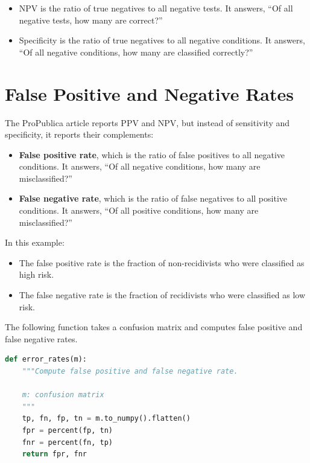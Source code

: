 \begin{itemize}
\item
  NPV is the ratio of true negatives to all negative tests. It answers,
  ``Of all negative tests, how many are correct?''
\item
  Specificity is the ratio of true negatives to all negative conditions.
  It answers, ``Of all negative conditions, how many are classified
  correctly?''
\end{itemize}

\hypertarget{false-positive-and-negative-rates}{%
\section{False Positive and Negative
Rates}\label{false-positive-and-negative-rates}}

The ProPublica article reports PPV and NPV, but instead of sensitivity
and specificity, it reports their complements:

\begin{itemize}
\item
  \textbf{False positive rate}, which is the ratio of false positives to
  all negative conditions. It answers, ``Of all negative conditions, how
  many are misclassified?''
\item
  \textbf{False negative rate}, which is the ratio of false negatives to
  all positive conditions. It answers, ``Of all positive conditions, how
  many are misclassified?''
\end{itemize}

In this example:

\begin{itemize}
\item
  The false positive rate is the fraction of non-recidivists who were
  classified as high risk.
\item
  The false negative rate is the fraction of recidivists who were
  classified as low risk.
\end{itemize}

The following function takes a confusion matrix and computes false
positive and false negative rates.

\begin{lstlisting}[language=Python,style=source]
def error_rates(m):
    """Compute false positive and false negative rate.

    m: confusion matrix
    """
    tp, fn, fp, tn = m.to_numpy().flatten()
    fpr = percent(fp, tn)
    fnr = percent(fn, tp)
    return fpr, fnr
\end{lstlisting}

